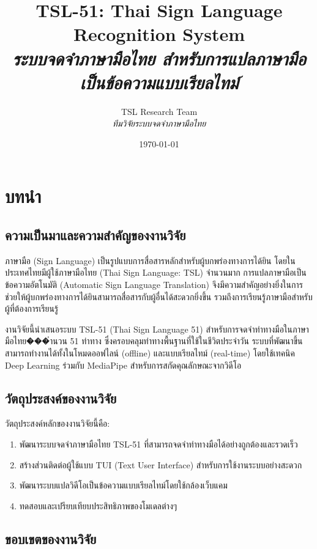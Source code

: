 \documentclass[12pt,a4paper]{report}
\title{
    \textbf{TSL-51: Thai Sign Language Recognition System} \\
    \textit{ระบบจดจำภาษามือไทย สำหรับการแปลภาษามือเป็นข้อความแบบเรียลไทม์}
}
\author{
    TSL Research Team \\
    \textit{ทีมวิจัยระบบจดจำภาษามือไทย}
}
\date{\today}
\begin{document}
\maketitle
\thispagestyle{empty}

\chapter{บทนำ}

\section{ความเป็นมาและความสำคัญของงานวิจัย}

ภาษามือ (Sign Language) เป็นรูปแบบการสื่อสารหลักสำหรับผู้บกพร่องทางการได้ยิน โดยในประเทศไทยมีผู้ใช้ภาษามือไทย (Thai Sign Language: TSL) จำนวนมาก 
การแปลภาษามือเป็นข้อความอัตโนมัติ (Automatic Sign Language Translation) จึงมีความสำคัญอย่างยิ่งในการช่วยให้ผู้บกพร่องทางการได้ยินสามารถสื่อสารกับผู้อื่นได้สะดวกยิ่งขึ้น 
รวมถึงการเรียนรู้ภาษามือสำหรับผู้ที่ต้องการเรียนรู้

งานวิจัยนี้นำเสนอระบบ TSL-51 (Thai Sign Language 51) สำหรับการจดจำท่าทางมือในภาษามือไทย���ำนวน 51 ท่าทาง 
ซึ่งครอบคลุมท่าทางพื้นฐานที่ใช้ในชีวิตประจำวัน ระบบที่พัฒนาขึ้นสามารถทำงานได้ทั้งในโหมดออฟไลน์ (offline) และแบบเรียลไทม์ (real-time) 
โดยใช้เทคนิค Deep Learning ร่วมกับ MediaPipe สำหรับการสกัดคุณลักษณะจากวิดีโอ

\section{วัตถุประสงค์ของงานวิจัย}

วัตถุประสงค์หลักของงานวิจัยนี้คือ:

\begin{enumerate}
    \item พัฒนาระบบจดจำภาษามือไทย TSL-51 ที่สามารถจดจำท่าทางมือได้อย่างถูกต้องและรวดเร็ว
    \item สร้างส่วนติดต่อผู้ใช้แบบ TUI (Text User Interface) สำหรับการใช้งานระบบอย่างสะดวก
    \item พัฒนาระบบแปลวิดีโอเป็นข้อความแบบเรียลไทม์โดยใช้กล้องเว็บแคม
    \item ทดสอบและเปรียบเทียบประสิทธิภาพของโมเดลต่างๆ
\end{enumerate}

\section{ขอบเขตของงานวิจัย}
\end{document}
